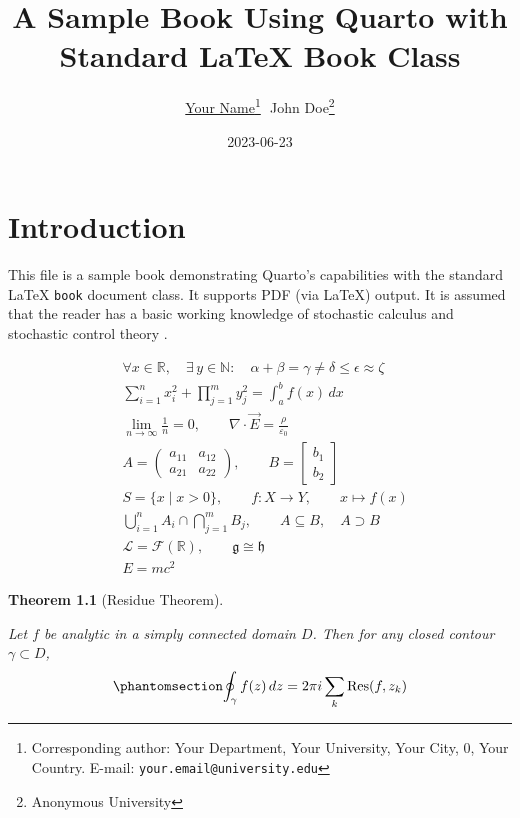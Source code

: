\documentclass[
  11pt,
  twoside]{book}
\title{\Large A Sample Book Using Quarto with Standard LaTeX Book Class}
\author{\href{https://your-university.edu/your-profile}{Your
Name}\footnote{Corresponding author: Your Department, Your
University, Your City, 0, Your
Country. E-mail: \texttt{your.email@university.edu}}\,~\orcidlink{0000-0000-0000-0001}\hspace{2em}John
Doe\footnote{Anonymous University}}
\date{\small 2023-06-23}
\renewcommand*\contentsname{Table of contents}
\newcommand\contentsname{Table of contents}
\theoremstyle{plain}
\newtheorem{theorem}{Theorem}[section]
\theoremstyle{definition}
\theoremstyle{plain}
\theoremstyle{plain}
\theoremstyle{remark}
\begin{document}
\maketitle
\clearpage
\mbox{}\thispagestyle{empty}
\clearpage
{}
\markright{}
\renewcommand*\contentsname{Contents}
{
\setcounter{tocdepth}{1}
\tableofcontents
}

\mainmatter
\chapter{Introduction}\label{sec-intro}

This file is a sample book demonstrating Quarto's capabilities with the
standard LaTeX \texttt{book} document class. It supports PDF (via LaTeX)
output. It is assumed that the reader has a basic working knowledge of
stochastic calculus \citet{karatzas1991brownian} and stochastic control
theory \citet{yong1999sch}.

\[
\begin{aligned}
&\forall x \in \mathbb{R},\quad 
\exists\, y \in \mathbb{N}:\quad 
\alpha + \beta = \gamma \neq \delta \leq \epsilon \approx \zeta \\
&\sum_{i=1}^{n} x_i^2 + \prod_{j=1}^{m} y_j^2 = \int_{a}^{b} f(x)\,dx \\
&\lim_{n\to\infty} \frac{1}{n} = 0, \qquad
\nabla \cdot \vec{E} = \frac{\rho}{\varepsilon_0} \\
&A = \begin{pmatrix} a_{11} & a_{12} \\ a_{21} & a_{22} \end{pmatrix}, \qquad
B = \begin{bmatrix} b_1 \\ b_2 \end{bmatrix} \\
&S = \{ x \mid x > 0 \}, \qquad
f: X \to Y, \qquad
x \mapsto f(x) \\
&\bigcup_{i=1}^n A_i \cap \bigcap_{j=1}^m B_j, \qquad
A \subseteq B, \quad A \supset B \\
&\mathcal{L} = \mathcal{F}(\mathbb{R}), \qquad
\mathfrak{g} \cong \mathfrak{h} \\
&\boxed{E = mc^2}
\end{aligned}
\]

\begin{theorem}[Residue
Theorem]\protect\hypertarget{thm-residue}{}\label{thm-residue}

Let \(f\) be analytic in a simply connected domain \(D\). Then for any
closed contour \(\gamma \subset D\),
\begin{equation}\protect\phantomsection\label{eq-einstein}{
\oint_\gamma f(z)\,dz = 2\pi i \sum_{k} \mathrm{Res}(f, z_k)
}\end{equation}

\end{theorem}
\end{document}
